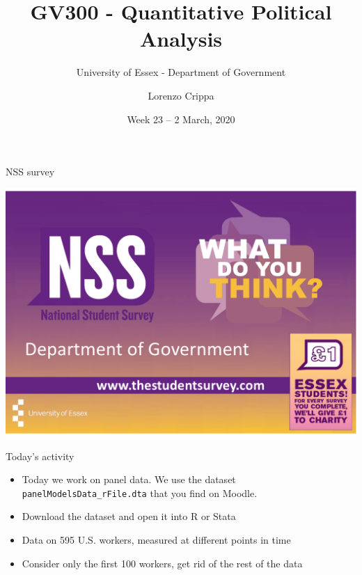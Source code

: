 \documentclass[xcolor=table,dvipsnames]{beamer}
\title{GV300 - Quantitative Political Analysis}
\subtitle{University of Essex - Department of Government}
\date{Week 23 -- 2 March, 2020}				%
\author{Lorenzo Crippa}
\begin{document}
\begin{frame}[plain]
\begin{center}
\titlepage
\end{center}
\end{frame}

\begin{frame}{NSS survey}
\begin{center}
\includegraphics[scale=0.36]{pictures/week_23_NSS.pdf}
\end{center}
\end{frame}

\begin{frame}{Today's activity}
\begin{itemize}
\item Today we work on panel data. We use the dataset \texttt{panelModelsData\_{}rFile.dta} that you find on Moodle. \pause
\item Download the dataset and open it into R or Stata \pause
\item Data on 595 U.S. workers, measured at different points in time \pause
\item Consider only the first 100 workers, get rid of the rest of the data
\end{itemize}
\end{frame}
\end{document}
